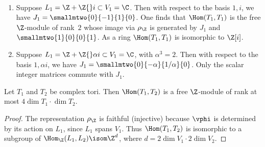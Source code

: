 \documentclass{report}
\begin{document}
\begin{example}\mbox{}\vspace{-4ex}\\%
\begin{enumerate}%
\item Suppose $L_1 = \Z + \Z{}i\subset V_1=\C$.   Then with
respect to the basis $1, i$, we have
$J_1=\smallmtwo{0}{-1}{1}{\hfill0}$.  One finds that $\Hom(T_1,
T_1)$ is the free $\Z$-module of rank~$2$ whose image via
$\rho_\Z$ is generated by $J_1$ and $\smallmtwo{1}{0}{0}{1}$.  As
a ring
$\Hom(T_1,T_1)$ is isomorphic to $\Z[i]$.%

\item Suppose $L_1 = \Z + \Z{}\alpha i\subset V_1=\C$, with
$\alpha^3=2$. Then with respect to the basis $1, \alpha i$, we
have $J_1=\smallmtwo{\hfill 0}{-\alpha}{1/\alpha}{\hfill 0}$.
Only the scalar integer matrices commute with $J_1$.
\end{enumerate}
\end{example}



\begin{proposition}
Let $T_1$ and $T_2$ be complex tori.  Then $\Hom(T_1,T_2)$ is a
free $\Z$-module of rank at most $4\dim T_1\cdot \dim T_2$.
\end{proposition}
\begin{proof}
The representation $\rho_\Z$ is faithful (injective) because
$\vphi$ is determined by its action on $L_1$, since $L_1$ spans
$V_1$.  Thus $\Hom(T_1,T_2)$ is isomorphic to a subgroup of
$\Hom_\Z(L_1,L_2)\isom \Z^d$, where $d=2\dim V_1 \cdot 2 \dim
V_2$.
\end{proof}
\end{document}
